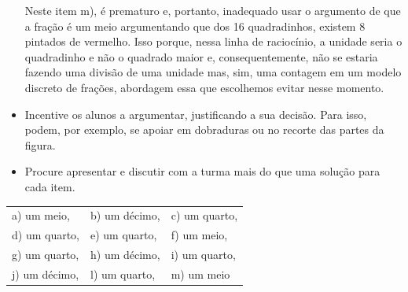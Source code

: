 \begin{orientacoes}
\begin{itemize}
Neste item m), é prematuro e, portanto, inadequado usar o argumento de que a fração é um meio argumentando que dos 16 quadradinhos, existem 8 pintados de vermelho. Isso porque, nessa linha de raciocínio, a unidade seria o quadradinho e não o quadrado maior e, consequentemente, não se estaria fazendo uma divisão de uma unidade mas, sim, uma contagem em um modelo discreto de frações, abordagem essa que escolhemos evitar nesse momento.   


\item Incentive os alunos a argumentar, justificando a sua decisão. Para isso, podem, por exemplo, se apoiar em dobraduras ou no recorte das partes da figura.
\item Procure apresentar e discutir com a turma mais do que uma solução para cada item.
\end{itemize} %
\end{orientacoes}

\begin{solucao}{}{}
  \begin{tabular}{lll}
a) um meio,&  b) um décimo,& c) um quarto,\\
d) um quarto,& e) um quarto,& f) um meio,\\
g) um quarto,& h) um décimo,& i) um quarto,\\
j) um décimo,& l) um quarto,& m) um meio
\end{tabular}
\end{solucao}

